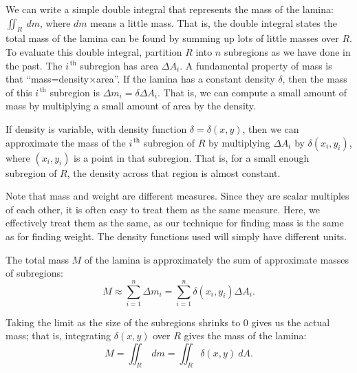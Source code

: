 We can write a simple double integral that represents the mass of the lamina: $\iint_R\ dm$, where $dm$ means a little mass. That is, the double integral states the total mass of the lamina can be found by summing up lots of little masses over $R$. To evaluate this double integral, partition $R$ into $n$ subregions as we have done in the past. The $i^{\,\text{th}}$ subregion has area $\Delta A_i$. 
A fundamental property of mass is that ``mass=density$\times$area''. If the lamina has a constant density $\delta$, then the mass of this $i^{\,\text{th}}$ subregion is $\Delta m_i=\delta\Delta A_i$. %
That is, we can compute a small amount of mass by multiplying a small amount of area by the density.

If density is variable, with density function $\delta= \delta(x,y)$, then we can approximate the mass of the $i^{\,\text{th}}$ subregion of $R$ by multiplying $\Delta A_i$ by $\delta(x_i,y_i)$, where $(x_i,y_i)$ is a point in that subregion. That is, for a small enough subregion of $R$, the density across that region is almost constant. 

Note that mass and weight are different measures. Since they are scalar multiples of each other, it is often easy to treat them as the same measure. Here,  we effectively treat them as the same, as our technique for finding mass is the same as for finding weight. The density functions used will simply have different units.

The total mass $M$ of the lamina is approximately the sum of approximate masses of subregions:
$$M \approx \sum_{i=1}^n \Delta m_i = \sum_{i=1}^n \delta(x_i,y_i)\Delta A_i.$$

Taking the limit as the size of the subregions shrinks to 0 gives us the actual mass; that is, integrating $\delta(x,y)$ over $R$ gives the mass of the lamina:
\begin{equation}
M = \iint_R\ dm = \iint_R \delta(x,y)\ dA.
\label{def:mass}
\end{equation}

